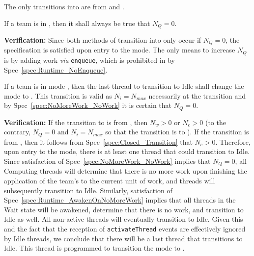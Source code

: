 \documentclass{article}
\begin{document}
\subsubsection{\TeamRunningNoMoreWork}
The only transitions into {\TeamRunningNoMoreWork}
are from {\TeamRunningOpen} and \TeamRunningClosed.

\begin{spec}
\label{spec:NoMoreWork_NoWork}
If a team is in \TeamRunningNoMoreWork, then it shall always be true that $N_Q =
0$.
\end{spec}
\textbf{Verification:}\hspace{0.125in}
Since both methods of transition into {\TeamRunningNoMoreWork} only occur if $N_Q = 0$,
the specification is satisfied upon entry to the mode.  The only means to
increase $N_Q$ is by adding work \textit{via} \texttt{enqueue}, which is
prohibited in {\TeamRunningNoMoreWork} by Spec~\ref{spec:Runtime_NoEnqueue}.

\begin{spec}
\label{spec:NoMoreWork_TransitionToIdle}
If a team is in mode \TeamRunningNoMoreWork, then the last thread to transition
to Idle shall change the mode to \TeamIdle.  This transition is valid as $N_i =
N_{max}$ necessarily at the transition and by Spec~\ref{spec:NoMoreWork_NoWork}
it is certain that $N_Q = 0$.
\end{spec}
\textbf{Verification:}\hspace{0.125in}  If the transition to
{\TeamRunningNoMoreWork} is from \TeamRunningOpen, then $N_w > 0$ or $N_c > 0$
(to the contrary, $N_Q = 0$ and $N_i = N_{max}$ so that the transition is to
\TeamIdle).  If the transition is from \TeamRunningClosed, then it follows from
Spec~\ref{spec:Closed_Transition} that $N_c > 0$.  Therefore, upon entry to the
mode, there is at least one thread that could transition to Idle.  Since
satisfaction of Spec~\ref{spec:NoMoreWork_NoWork} implies that $N_Q = 0$, all
Computing threads will determine that there is no more work
upon finishing the application of the team's
\taskroutine to the current unit of work, and threads will
subsequently transition to Idle.  Similarly, satisfaction of
Spec~\ref{spec:Runtime_AwakenOnNoMoreWork} implies that all threads in the Wait
state will be awakened, determine that there is no work, and transition to Idle
as well.  All non-active threads will eventually transition to Idle.
Given this and the fact that the reception of \texttt{activateThread} events are
effectively ignored by Idle threads, we conclude that there will be a last
thread that transitions to Idle.  This thread is programmed to transition the
mode to \TeamIdle.
\end{document}

